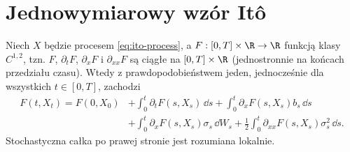 \section{Jednowymiarowy wzór Itô}
\begin{twierdzenie}
\label{th:ito1}
Niech $X$ będzie procesem \eqref{eq:ito-process}, a
$F:[0,T]\times\R\to\R$ funkcją klasy $C^{1,2}$,
tzn. $F$, $\partial_tF$, $\partial_xF$ i
$\partial_{xx}F$ są ciągłe na $[0,T]\times\R$
(jednostronnie na końcach przedziału czasu). Wtedy
z prawdopodobieństwem jeden, jednocześnie dla wszystkich
$t\in[0,T]$, zachodzi
\[
\begin{split}
F(t,X_t)=F(0,X_0)
&+\int_0^t\partial_tF(s,X_s)\,\dd s
+\int_0^t\partial_xF(s,X_s)b_s\,\dd s\\
&+\int_0^t\partial_xF(s,X_s)\sigma_s\,\dd W_s
+\frac12\int_0^t\partial_{xx}F(s,X_s)\sigma_s^2\,\dd s.
\end{split}
\tag{3.3}\label{eq:ito1}
\]
Stochastyczna całka po prawej stronie jest rozumiana lokalnie.
\end{twierdzenie}
